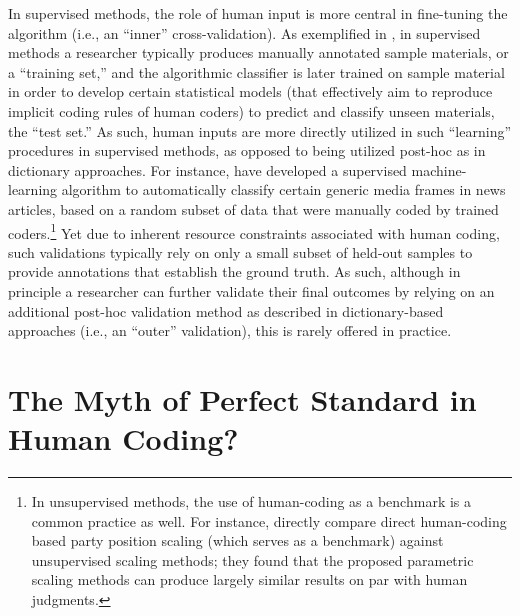 \documentclass[man, 12pt, a4paper, nolmodern, noextraspace]{apa6}
\begin{document}
    In supervised methods, the role of human input is more central in fine-tuning the algorithm (i.e., an \enquote{inner} cross-validation). As exemplified in \textcite{scharkow2013thematic}, in supervised methods a researcher typically produces manually annotated sample materials, or a \enquote{training set,} and the algorithmic classifier is later trained on sample material in order to develop certain statistical models (that effectively aim to reproduce implicit coding rules of human coders) to predict and classify unseen materials, the \enquote{test set.} As such, human inputs are more directly utilized in such \enquote{learning} procedures in supervised methods, as opposed to being utilized post-hoc as in dictionary approaches. For instance, \textcite{burscher2014teaching} have developed a supervised machine-learning algorithm to automatically classify certain generic media frames in news articles, based on a random subset of data that were manually coded by trained coders.\footnote{ In unsupervised methods, the use of human-coding as a benchmark is a common practice as well. For instance, \textcite{lowe2013validating} directly compare direct human-coding based party position scaling (which serves as a benchmark) against unsupervised scaling methods; they found that the proposed parametric scaling methods can produce largely similar results on par with human judgments.} Yet due to inherent resource constraints associated with human coding, such validations typically rely on only a small subset of held-out samples to provide annotations that establish the ground truth. As such, although in principle a researcher can further validate their final outcomes by relying on an additional post-hoc validation method as described in dictionary-based approaches (i.e., an \enquote{outer} validation), this is rarely offered in practice.   
    
\section{The Myth of Perfect Standard in Human Coding?}
\end{document}
